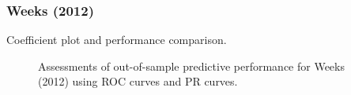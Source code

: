 \clearpage
\subsubsection*{Weeks (2012)}

Coefficient plot and performance comparison.


\FloatBarrier

\begin{figure}
	\centering   
	\caption{Assessments of out-of-sample predictive performance for Weeks (2012) using ROC curves and PR curves.}
\end{figure}
\FloatBarrier